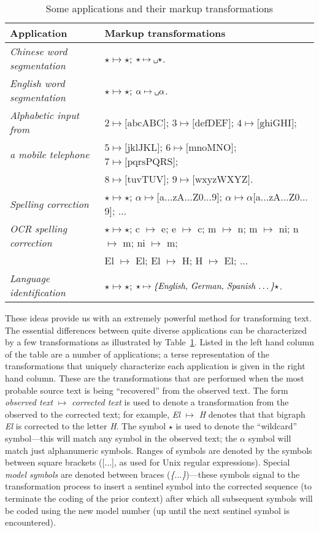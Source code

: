 \documentclass[11pt]{article}
\begin{document}
\begin{table}
\centering
\begin{tabular}{|l|l|} \hline
{\bf Application} & {\bf Markup transformations} \\ \hline \hline
{\em Chinese word segmentation} & $\star \mapsto \star$; $\star \mapsto \verb*| | \star$. \\ \hline
{\em English word segmentation} & $\star \mapsto \star$; $\alpha \mapsto \verb*| | \alpha$. \\ \hline
{\em Alphabetic input from}
& $2 \mapsto \mbox{[abcABC]}$; $3 \mapsto \mbox{[defDEF]}$; $4 \mapsto \mbox{[ghiGHI]}$; \\
{\em a mobile telephone}
& $5 \mapsto \mbox{[jklJKL]}$; $6 \mapsto \mbox{[mnoMNO]}$; $7 \mapsto \mbox{[pqrsPQRS]}$; \\
& $8 \mapsto \mbox{[tuvTUV]}$; $9 \mapsto \mbox{[wxyzWXYZ]}$. \\ \hline
{\em Spelling correction}
& $\star \mapsto \star$; $\alpha \mapsto $[a$\ldots$zA$\ldots$Z0$\ldots$9];
$\alpha \mapsto \alpha$[a$\ldots$zA$\ldots$Z0$\ldots$9]; $\ldots$ \\ \hline
{\em OCR spelling correction}
& $\star \mapsto \star$; c $\mapsto$ e; e $\mapsto$ c; m $\mapsto$ n; m $\mapsto$ ni; n $\mapsto$ m; ni $\mapsto$ m; \\
& El $\mapsto$ El; El $\mapsto$ H; H $\mapsto$ El; $\ldots$ \\\hline
{\em Language identification}
& $\star \mapsto \star$; $\star \mapsto \mbox{\em \{English, German, Spanish \ldots\}} \star$. \\ \hline
\end{tabular}
\caption{\label{table.markups} Some applications and their markup transformations}
\end{table}

These ideas provide us with an extremely powerful method for transforming text.
The essential differences between quite diverse applications can be characterized
by a few transformations as illustrated by Table~\ref{table.markups}.
Listed in the left hand column of the table are a number of applications;
a terse representation of the transformations that uniquely characterize each
application is given in the right hand column.
These are the transformations that are performed
when the most probable source text is being ``recovered'' from the observed text.
The form {\em observed text} $\mapsto$ {\em corrected text} is used to denote a transformation
from the observed to the corrected text; for example, {\em El} $\mapsto$ {\em H} denotes that
that bigraph {\em El} is corrected to the letter {\em H}. The symbol $\star$ is used to denote the
``wildcard'' symbol---this will match any symbol in the observed text; the $\alpha$ symbol
will match just alphanumeric symbols. Ranges of symbols are denoted by the symbols between
square brackets ([$\ldots$], as used for Unix regular expressions). Special {\em model symbols}
are denoted between braces ({\em \{$\ldots$\}})---these symbols signal to the transformation process
to insert a sentinel symbol into the corrected sequence (to terminate the coding of the prior context)
after which all subsequent symbols will be coded using the new model number (up until the next
sentinel symbol is encountered).
\end{document}
